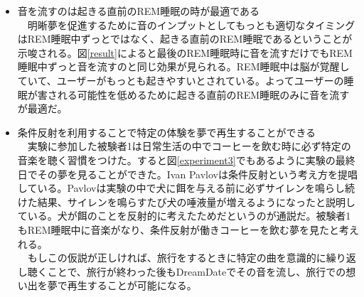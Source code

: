 \begin{itemize}
\item 音を流すのは起きる直前のREM睡眠の時が最適である\\
　明晰夢を促進するために音のインプットとしてもっとも適切なタイミングはREM睡眠中ずっとではなく、起きる直前のREM睡眠であるということが示唆される。図\ref{result}によると最後のREM睡眠時に音を流すだけでもREM睡眠中ずっと音を流すのと同じ効果が見られる。REM睡眠中は脳が覚醒していて、ユーザーがもっとも起きやすいとされている\cite{remNonRem}。よってユーザーの睡眠が害される可能性を低めるために起きる直前のREM睡眠のみに音を流すが最適だ。\\

\item 条件反射を利用することで特定の体験を夢で再生することができる\\
　実験に参加した被験者1は日常生活の中でコーヒーを飲む時に必ず特定の音楽を聴く習慣をつけた。すると図\ref{experiment3}でもあるように実験の最終日でその夢を見ることができた。Ivan Pavlovは条件反射という考え方を提唱している\cite{pavlov}。Pavlovは実験の中で犬に餌を与える前に必ずサイレンを鳴らし続けた結果、サイレンを鳴らすたび犬の唾液量が増えるようになったと説明している。犬が餌のことを反射的に考えたためだというのが通説だ。被験者1もREM睡眠中に音楽がなり、条件反射が働きコーヒーを飲む夢を見たと考えれる。\\
　もしこの仮説が正しければ、旅行をするときに特定の曲を意識的に繰り返し聴くことで、旅行が終わった後もDreamDateでその音を流し、旅行での想い出を夢で再生することが可能になる。\\
\end{itemize}